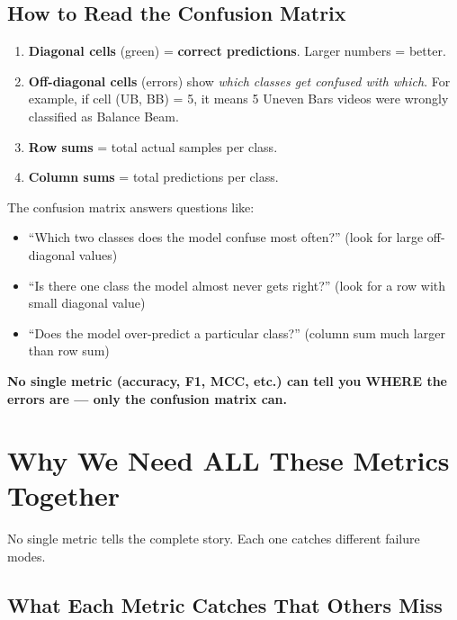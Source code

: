\documentclass[12pt, a4paper]{article}
\begin{document}
\subsection{How to Read the Confusion Matrix}

\begin{enumerate}[leftmargin=*, itemsep=0.3cm]
    \item \textbf{Diagonal cells} (green) = \textbf{correct predictions}. Larger numbers = better.
    \item \textbf{Off-diagonal cells} (errors) show \textit{which classes get confused with which}. For example, if cell (UB, BB) = 5, it means 5 Uneven Bars videos were wrongly classified as Balance Beam.
    \item \textbf{Row sums} = total actual samples per class.
    \item \textbf{Column sums} = total predictions per class.
\end{enumerate}

\begin{intuitionbox}
The confusion matrix answers questions like:
\begin{itemize}
    \item ``Which two classes does the model confuse most often?'' (look for large off-diagonal values)
    \item ``Is there one class the model almost never gets right?'' (look for a row with small diagonal value)
    \item ``Does the model over-predict a particular class?'' (column sum much larger than row sum)
\end{itemize}
\textbf{No single metric (accuracy, F1, MCC, etc.) can tell you WHERE the errors are --- only the confusion matrix can.}
\end{intuitionbox}


\newpage
\section{Why We Need ALL These Metrics Together}

No single metric tells the complete story. Each one catches different failure modes.

\subsection{What Each Metric Catches That Others Miss}
\end{document}
